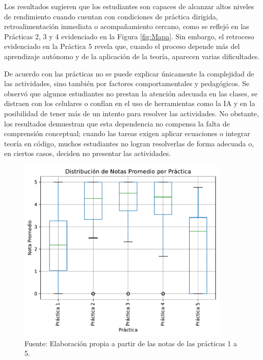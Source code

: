 \documentclass[letter,oneside,12pt,spanish]{report}
\begin{document}
Los resultados sugieren que los estudiantes son capaces de alcanzar altos niveles de rendimiento cuando cuentan con condiciones de práctica dirigida, retroalimentación inmediata o acompañamiento cercano, como se reflejó en las Prácticas 2, 3 y 4 evidenciado en la Figura \ref{fig:Mapa}. Sin embargo, el retroceso evidenciado en la Práctica 5 revela que, cuando el proceso depende más del aprendizaje autónomo y de la aplicación de la teoría, aparecen varias dificultades.

De acuerdo con las prácticas no se puede explicar únicamente la complejidad de las actividades, sino también por factores comportamentales y pedagógicos. Se observó que algunos estudiantes no prestan la atención adecuada en las clases, se distraen con los celulares o confían en el uso de herramientas como la IA y en la posibilidad de tener más de un intento para resolver las actividades. No obstante, los resultados demuestran que esta dependencia no compensa la falta de comprensión conceptual; cuando las tareas exigen aplicar ecuaciones o integrar teoría en código, muchos estudiantes no logran resolverlas de forma adecuada o, en ciertos casos, deciden no presentar las actividades.

\begin{figure}[ht]
	\centering
	\includegraphics[width=0.9\textwidth]{Figs/Promedio_Notas.pdf}
	\label{fig:Promedio}
	\\Fuente: Elaboración propia a partir de las notas de las prácticas 1 a 5.
\end{figure}
\end{document}
